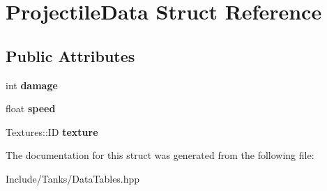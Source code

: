 \hypertarget{struct_projectile_data}{}\section{Projectile\+Data Struct Reference}
\label{struct_projectile_data}
\subsection*{Public Attributes}
\begin{DoxyCompactItemize}
\item 
\hypertarget{struct_projectile_data_add13e5536e407fa142dc8dc1dea3959b}{}int {\bfseries damage}\label{struct_projectile_data_add13e5536e407fa142dc8dc1dea3959b}

\item 
\hypertarget{struct_projectile_data_ad5203e5d2fccba6c543de57d1e9070d5}{}float {\bfseries speed}\label{struct_projectile_data_ad5203e5d2fccba6c543de57d1e9070d5}

\item 
\hypertarget{struct_projectile_data_af72f694e0c4ef9fa6e034167a32592f9}{}Textures\+::\+I\+D {\bfseries texture}\label{struct_projectile_data_af72f694e0c4ef9fa6e034167a32592f9}

\end{DoxyCompactItemize}


The documentation for this struct was generated from the following file\+:\begin{DoxyCompactItemize}
\item 
Include/\+Tanks/Data\+Tables.\+hpp\end{DoxyCompactItemize}
